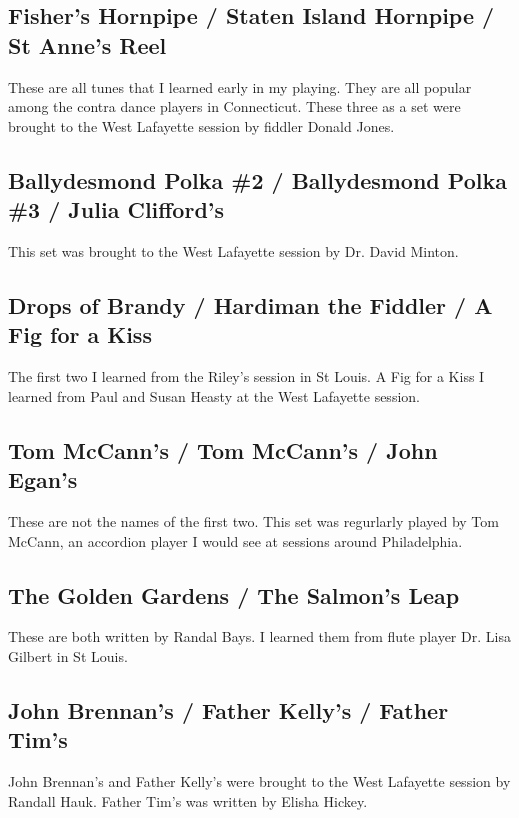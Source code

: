 \documentclass[11pt,letterpaper]{article}
\begin{document}
\subsection*{Fisher's Hornpipe / Staten Island Hornpipe / St Anne's Reel}

These are all tunes that I learned early in my playing. They are all popular among the contra dance players in Connecticut. These three as a set were brought to the West Lafayette session by fiddler Donald Jones. 

\subsection*{Ballydesmond Polka \#2 / Ballydesmond Polka \#3 / Julia Clifford's} 

This set was brought to the West Lafayette session by Dr. David Minton.

\subsection*{Drops of Brandy / Hardiman the Fiddler / A Fig for a Kiss} 

The first two I learned from the Riley's session in St Louis. A Fig for a Kiss I learned from Paul and Susan Heasty at the West Lafayette session.

\subsection*{Tom McCann's / Tom McCann's / John Egan's} 

These are not the names of the first two. This set was regurlarly played by Tom McCann, an accordion player I would see at sessions around Philadelphia. 

\subsection*{The Golden Gardens / The Salmon's Leap} 

These are both written by Randal Bays. I learned them from flute player Dr. Lisa Gilbert in St Louis.

\subsection*{John Brennan's / Father Kelly's / Father Tim's} 

John Brennan's and Father Kelly's were brought to the West Lafayette session by Randall Hauk. Father Tim's was written by Elisha Hickey.
\end{document}
